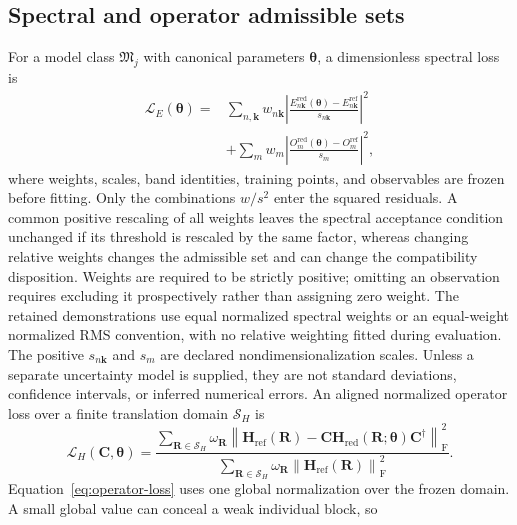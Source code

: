 \documentclass[preprint,12pt]{elsarticle}
\begin{document}
\subsection{Spectral and operator admissible sets}
\label{sec:admissible-sets}

For a model class $\mathfrak{M}_j$ with canonical parameters
$\bm{\theta}$, a dimensionless spectral loss is
\begin{equation}
\begin{split}
 \mathcal{L}_E(\bm{\theta})={}&
 \sum_{n,\bm{k}}w_{n\bm{k}}
 \left|
 \frac{E_{n\bm{k}}^{\mathrm{red}}(\bm{\theta})
 -E_{n\bm{k}}^{\mathrm{ref}}}{s_{n\bm{k}}}
 \right|^2\\
 &+\sum_m w_m
 \left|
 \frac{O_m^{\mathrm{red}}(\bm{\theta})-O_m^{\mathrm{ref}}}{s_m}
 \right|^2,
\end{split}
\label{eq:spectral-loss}
\end{equation}
where weights, scales, band identities, training points, and observables are
frozen before fitting. Only the combinations $w/s^2$ enter the squared
residuals. A common positive rescaling of all weights leaves the spectral
acceptance condition unchanged if its threshold is rescaled by the same factor,
whereas changing relative weights changes the admissible set and can change the
compatibility disposition. Weights are required to be strictly positive;
omitting an observation requires excluding it prospectively rather than assigning
zero weight. The retained demonstrations use equal normalized spectral weights or
an equal-weight normalized RMS convention, with no relative weighting fitted during
evaluation. The positive $s_{n\bm{k}}$ and $s_m$ are declared
nondimensionalization scales. Unless a separate uncertainty model is supplied,
they are not standard deviations, confidence intervals, or inferred numerical
errors. An aligned normalized operator loss over a finite translation domain
$\mathcal{S}_H$ is
\begin{equation}
 \mathcal{L}_H(\bm{C},\bm{\theta})
 =
 \frac{
 \displaystyle\sum_{\bm{R}\in\mathcal{S}_H}\omega_{\bm{R}}
 \left\|\bm{H}_{\mathrm{ref}}(\bm{R})
 -\bm{C}\bm{H}_{\mathrm{red}}(\bm{R};\bm{\theta})
 \bm{C}^{\dagger}\right\|_{\mathrm{F}}^2
 }{
 \displaystyle\sum_{\bm{R}\in\mathcal{S}_H}\omega_{\bm{R}}
 \left\|\bm{H}_{\mathrm{ref}}(\bm{R})\right\|_{\mathrm{F}}^2
 }.
 \label{eq:operator-loss}
\end{equation}
Equation~\eqref{eq:operator-loss} uses one global normalization over the frozen
domain. A small global value can conceal a weak individual block, so
\end{document}

